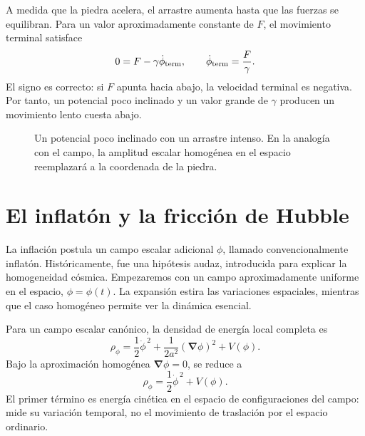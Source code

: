 A medida que la piedra acelera, el arrastre aumenta hasta que las fuerzas se equilibran. Para un valor aproximadamente constante de \(F\), el movimiento terminal satisface
\begin{equation}
0=F-\gamma\dot\phi_{\rm term},
\qquad
\dot\phi_{\rm term}=\frac{F}{\gamma}.
\end{equation}
El signo es correcto: si \(F\) apunta hacia abajo, la velocidad terminal es negativa. Por tanto, un potencial poco inclinado y un valor grande de \(\gamma\) producen un movimiento lento cuesta abajo.

\begin{figure}[htbp]
\centering
{}
\caption{Un potencial poco inclinado con un arrastre intenso. En la analogía con el campo, la amplitud escalar homogénea en el espacio reemplazará a la coordenada de la piedra.}
\label{fig:c08-shallow-potential}
\end{figure}

\section{El inflatón y la fricción de Hubble}

La inflación postula un campo escalar adicional \(\phi\), llamado convencionalmente inflatón. Históricamente, fue una hipótesis audaz, introducida para explicar la homogeneidad cósmica. Empezaremos con un campo aproximadamente uniforme en el espacio, \(\phi=\phi(t)\). La expansión estira las variaciones espaciales, mientras que el caso homogéneo permite ver la dinámica esencial.

Para un campo escalar canónico, la densidad de energía local completa es
\begin{equation}
\rho_\phi
=
\frac12\dot\phi^{\,2}
+\frac{1}{2a^2}(\boldsymbol\nabla\phi)^2
+V(\phi).
\end{equation}
Bajo la aproximación homogénea \(\boldsymbol\nabla\phi=0\), se reduce a
\begin{equation}
\rho_\phi=\frac12\dot\phi^{\,2}+V(\phi).
\label{eq:c08-scalar-density}
\end{equation}
El primer término es energía cinética en el espacio de configuraciones del campo: mide su variación temporal, no el movimiento de traslación por el espacio ordinario.

